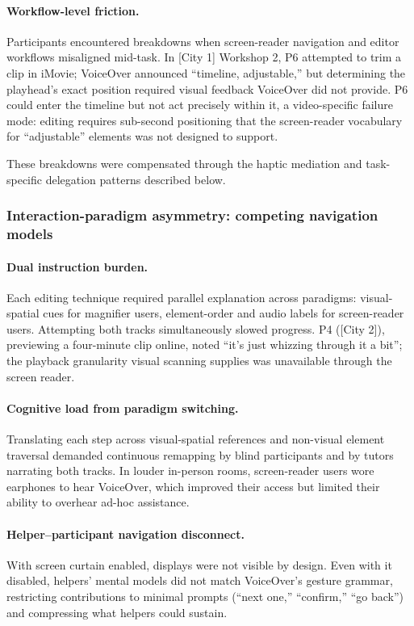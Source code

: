 \paragraph{Workflow-level friction.}
Participants encountered breakdowns when screen-reader navigation and editor workflows misaligned mid-task. In [City 1] Workshop 2, P6 attempted to trim a clip in iMovie; VoiceOver announced ``timeline, adjustable,'' but determining the playhead's exact position required visual feedback VoiceOver did not provide. P6 could enter the timeline but not act precisely within it, a video-specific failure mode: editing requires sub-second positioning that the screen-reader vocabulary for ``adjustable'' elements was not designed to support.

These breakdowns were compensated through the haptic mediation and task-specific delegation patterns described below.

\subsubsection{Interaction-paradigm asymmetry: competing navigation models}

\paragraph{Dual instruction burden.}
Each editing technique required parallel explanation across paradigms: visual-spatial cues for magnifier users, element-order and audio labels for screen-reader users. Attempting both tracks simultaneously slowed progress. P4 ([City 2]), previewing a four-minute clip online, noted ``it's just whizzing through it a bit''; the playback granularity visual scanning supplies was unavailable through the screen reader.

\paragraph{Cognitive load from paradigm switching.}
Translating each step across visual-spatial references and non-visual element traversal demanded continuous remapping by blind participants and by tutors narrating both tracks. In louder in-person rooms, screen-reader users wore earphones to hear VoiceOver, which improved their access but limited their ability to overhear ad-hoc assistance.

\paragraph{Helper--participant navigation disconnect.}
With screen curtain enabled, displays were not visible by design. Even with it disabled, helpers' mental models did not match VoiceOver's gesture grammar, restricting contributions to minimal prompts (``next one,'' ``confirm,'' ``go back'') and compressing what helpers could sustain.

